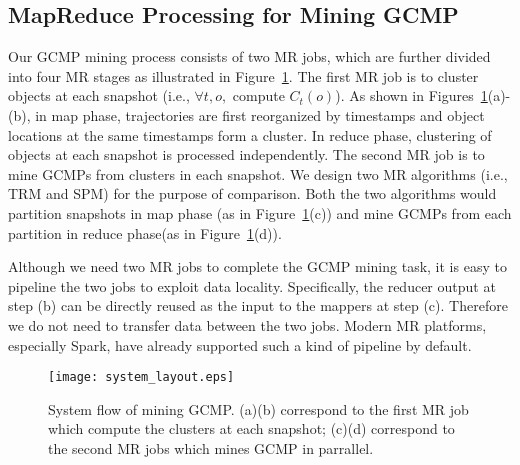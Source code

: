 \subsection{MapReduce Processing for Mining GCMP}
Our GCMP mining process consists of two MR jobs, which are further
divided into four MR stages as illustrated in Figure~\ref{fig:overview}.
The first MR job is to cluster objects at each snapshot (i.e.,
 $\forall t, o,$ compute $C_t(o)$). As shown in Figures~\ref{fig:overview}(a)-(b),
in map phase, trajectories are first reorganized by timestamps and object locations
at the same timestamps form a cluster. In reduce phase, clustering of objects at each
snapshot is processed independently. The second MR job is to mine GCMPs from 
clusters in each snapshot. We design two MR algorithms (i.e., TRM and SPM) for 
the purpose of comparison. Both the two algorithms would partition snapshots in map phase
(as in Figure~\ref{fig:overview}(c))
and mine GCMPs from each partition in reduce phase(as in Figure~\ref{fig:overview}(d)).


Although we need two MR jobs to complete the GCMP mining task, 
it is easy to pipeline the two jobs to exploit data locality.
Specifically, the reducer output at step (b) can be directly reused 
as the input to the mappers at step (c). Therefore we do not need to 
transfer data between the two jobs. Modern MR platforms, especially Spark, have
already supported such a kind of pipeline by default.

\begin{figure} [t]
\center
\texttt{[image: system\_layout.eps]}
\caption{System flow of mining GCMP. (a)(b) correspond to the first MR job which compute the clusters at each snapshot; 
(c)(d) correspond to the second MR jobs which mines GCMP in parrallel.}
\label{fig:overview}
\end{figure}

